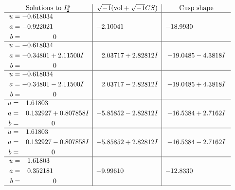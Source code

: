 \documentclass[1p]{elsarticle_modified}
\theoremstyle{definition}
\newcommand{\I}{\sqrt{-1}}
\begin{document}
$$\begin{array}{c|c|c}  
\text{Solutions to }I^u_{2}& \I (\text{vol} + \sqrt{-1}CS) & \text{Cusp shape}\\
 \hline 
\begin{aligned}
u &= -0.618034\phantom{ +0.000000I} \\
a &= -0.922021\phantom{ +0.000000I} \\
b &= \phantom{-0.000000 } 0\end{aligned}
 & -2.10041\phantom{ +0.000000I} & -18.9930\phantom{ +0.000000I} \\ \hline\begin{aligned}
u &= -0.618034\phantom{ +0.000000I} \\
a &= -0.34801 + 2.11500 I \\
b &= \phantom{-0.000000 } 0\end{aligned}
 & \phantom{-}2.03717 + 2.82812 I & -19.0485 - 4.3818 I \\ \hline\begin{aligned}
u &= -0.618034\phantom{ +0.000000I} \\
a &= -0.34801 - 2.11500 I \\
b &= \phantom{-0.000000 } 0\end{aligned}
 & \phantom{-}2.03717 - 2.82812 I & -19.0485 + 4.3818 I \\ \hline\begin{aligned}
u &= \phantom{-}1.61803\phantom{ +0.000000I} \\
a &= \phantom{-}0.132927 + 0.807858 I \\
b &= \phantom{-0.000000 } 0\end{aligned}
 & -5.85852 - 2.82812 I & -16.5384 + 2.7162 I \\ \hline\begin{aligned}
u &= \phantom{-}1.61803\phantom{ +0.000000I} \\
a &= \phantom{-}0.132927 - 0.807858 I \\
b &= \phantom{-0.000000 } 0\end{aligned}
 & -5.85852 + 2.82812 I & -16.5384 - 2.7162 I \\ \hline\begin{aligned}
u &= \phantom{-}1.61803\phantom{ +0.000000I} \\
a &= \phantom{-}0.352181\phantom{ +0.000000I} \\
b &= \phantom{-0.000000 } 0\end{aligned}
 & -9.99610\phantom{ +0.000000I} & -12.8330\phantom{ +0.000000I}\\
 \hline 
 \end{array}$$\newpage
\end{document}
